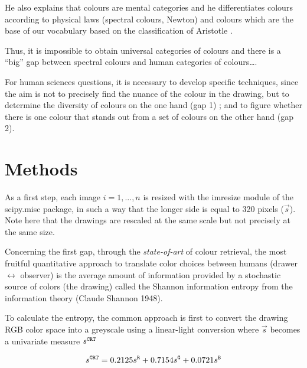 \documentclass[11pt,a4paper]{article}
\begin{document}
He also explains that colours are mental categories
\cite[][p. 36]{pastoureau2017} and he differentiates colours according
to physical laws (spectral colours, Newton) and colours which are the
base of our vocabulary based on the classification of Aristotle
\cite[][p. 90-91]{pastoureau2017}.

Thus, it is impossible to obtain universal categories of colours and
there is a ``big'' gap between spectral colours and human categories of
colours\ldots{}.

For human sciences questions, it is necessary to develop specific
techniques, since the aim is not to precisely find the nuance of the
colour in the drawing, but to determine the diversity of colours on the
one hand (gap 1) ; and to figure whether there is one colour that stands
out from a set of colours on the other hand (gap 2).


\section{Methods}\label{methods}

As a first step, each image \(i=1,...,n\) is resized with the imresize
module of the scipy.misc package, in such a way that the longer side is
equal to 320 pixels (\(\vec{s}\)). Note here that the drawings are
rescaled at the same scale but not precisely at the same size.


Concerning the first gap, through the \emph{state-of-art} of colour
retrieval, the most fruitful quantitative approach to translate color
choices between humans (drawer \(\leftrightarrow\) observer) is the
average amount of information provided by a stochastic source of colors
(the drawing) called the Shannon information entropy from the
information theory (Claude Shannon 1948).

To calculate the entropy, the common approach is first to convert the
drawing RGB color space into a greyscale using a linear-light conversion
where \(\vec{s}\) becomes a univariate measure \(s^{\tt \tiny CRT}\)

\[s^{\tt \scriptstyle CRT} = 0.2125s^{\tt \scriptstyle R} + 0.7154 s^{\tt \scriptstyle G}+ 0.0721 s^{\tt \scriptstyle B}\]
\end{document}
